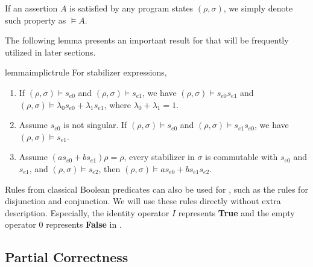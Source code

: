 If an assertion $A$ is satisfied by any program states $(\rho, \sigma)$, we simply denote such property as $\models A$.



The following lemma presents an important result for {\assnname} that will be frequently utilized in later sections.

\begin{restatable}{lemma}{implictrule}
	\label{lem:implicitrule}
	For stabilizer expressions,
	\begin{enumerate}
		\item If $(\rho, \sigma) \models s_{e0}$ and $(\rho, \sigma) \models s_{e1}$, we have $(\rho, \sigma) \models s_{e0}s_{e1}$ and $(\rho, \sigma) \models \lambda_0 s_{e0}+\lambda_1 s_{e1}$, where  $\lambda_0+ \lambda_1=1$.
		\item Assume $s_{e0}$ is not singular. If $(\rho, \sigma) \models s_{e0}$ and $(\rho, \sigma) \models s_{e1}s_{e0}$, we have $(\rho, \sigma) \models s_{e1}$.
		\item Assume $(a s_{e0} + bs_{e1})\rho = \rho$, every stabilizer in $\sigma$ is commutable with $s_{e0}$ and $s_{e1}$, and $(\rho, \sigma) \models  s_{e2}$, then
		$(\rho, \sigma) \models a s_{e0} + bs_{e1}s_{e2}$.
	\end{enumerate}
\end{restatable}

Rules from classical Boolean predicates can also be used for {\assnname}, such as the rules for disjunction and conjunction. We will use these rules directly without extra description. Especially, the identity operator $I$ represents \textbf{True} and the empty operator $0$ represents \textbf{False} in {\assnname}.



\subsection{Partial Correctness}
\label{subsect:partial}


